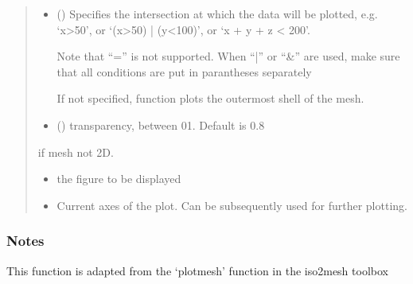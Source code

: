\documentclass[letterpaper,10pt,english]{sphinxmanual}
\begin{document}
\begin{fulllineitems}
\begin{quote}
\begin{description}
\begin{itemize}
\item {} 
\sphinxAtStartPar
{} (\sphinxstyleliteralemphasis{\sphinxupquote{, }}) \textendash{} 
\sphinxAtStartPar
Specifies the intersection at which the data will be plotted, e.g. ‘x\textgreater{}50’, or ‘(x\textgreater{}50) | (y\textless{}100)’, or ‘x + y + z \textless{} 200’.

\sphinxAtStartPar
Note that “=” is not supported. When “|” or “\&” are used, make sure that all conditions are put in parantheses separately

\sphinxAtStartPar
If not specified, function plots the outermost shell of the mesh.


\item {} 
\sphinxAtStartPar
{} (\sphinxstyleliteralemphasis{\sphinxupquote{, }}) \textendash{} transparency, between 0\sphinxhyphen{}1. Default is 0.8

\end{itemize}

\sphinxAtStartPar
{} \textendash{} if mesh not 2D.

\sphinxAtStartPar
\begin{itemize}
\item {} 
\sphinxAtStartPar
{} \textendash{} the figure to be displayed

\item {} 
\sphinxAtStartPar
{} \textendash{} Current axes of the plot. Can be subsequently used for further plotting.

\end{itemize}


\end{description}\end{quote}
\subsubsection*{Notes}

\sphinxAtStartPar
This function is adapted from the ‘plotmesh’ function in the iso2mesh toolbox

\sphinxAtStartPar
{}

\end{fulllineitems}
\end{document}
